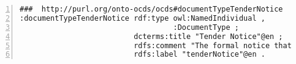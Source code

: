 \begin{lstlisting}[captionpos=b, caption={Extracto de código de la ontología OCDSPY}, label={lst:ocdspyAnexo},  numbers=left,  numberstyle=\tiny\color{mygray},frame=single, breaklines=true]
###  http://purl.org/onto-ocds/ocds#documentTypeTenderNotice
:documentTypeTenderNotice rdf:type owl:NamedIndividual ,
                                   :DocumentType ;
                          dcterms:title "Tender Notice"@en ;
                          rdfs:comment "The formal notice that gives details of a tender. This may be a link to a downloadable document, to a web page, or to an official gazette in which the notice is contained."@en ;
                          rdfs:label "tenderNotice"@en .
\end{lstlisting}

